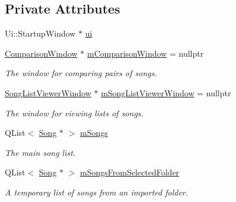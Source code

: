 \subsection*{Private Attributes}
\begin{DoxyCompactItemize}
\item 
Ui\+::\+Startup\+Window $\ast$ \mbox{\hyperlink{class_startup_window_a5afeeaabe9a34a02a67d2e7d9f36dc09}{ui}}
\item 
\mbox{\hyperlink{class_comparison_window}{Comparison\+Window}} $\ast$ \mbox{\hyperlink{class_startup_window_a674395b4edbe76568be4f0f4c7577ac1}{m\+Comparison\+Window}} = nullptr
\begin{DoxyCompactList}\small\item\em The window for comparing pairs of songs. \end{DoxyCompactList}\item 
\mbox{\hyperlink{class_song_list_viewer_window}{Song\+List\+Viewer\+Window}} $\ast$ \mbox{\hyperlink{class_startup_window_a26e72433e3cf3d35ae49d77d91f5cc38}{m\+Song\+List\+Viewer\+Window}} = nullptr
\begin{DoxyCompactList}\small\item\em The window for viewing lists of songs. \end{DoxyCompactList}\item 
Q\+List$<$ \mbox{\hyperlink{class_song}{Song}} $\ast$ $>$ \mbox{\hyperlink{class_startup_window_ae57241505d74639131cb0ece2cfc922b}{m\+Songs}}
\begin{DoxyCompactList}\small\item\em The main song list. \end{DoxyCompactList}\item 
Q\+List$<$ \mbox{\hyperlink{class_song}{Song}} $\ast$ $>$ \mbox{\hyperlink{class_startup_window_af419f4809f6fae0b370f1d9112dae9b4}{m\+Songs\+From\+Selected\+Folder}}
\begin{DoxyCompactList}\small\item\em A temporary list of songs from an imported folder. \end{DoxyCompactList}\end{DoxyCompactItemize}
